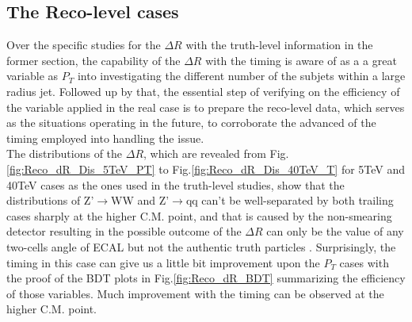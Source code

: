 

\subsection{The Reco-level cases}
Over the specific studies for the $\Delta R$ with the truth-level information in the former section, the capability of the $\Delta R$ with the timing is aware of as a a great variable as $P_{T}$ into investigating the different number of the subjets within a large radius jet. Followed up by that, the essential step of verifying on the efficiency of the variable applied in the real case is to prepare the reco-level data, which serves as the situations operating in the future, to corroborate the advanced of the timing employed into handling the issue.\\ 

The distributions of the $\Delta R$, which are revealed from Fig.\ref{fig:Reco_dR_Dis_5TeV_PT} to Fig.\ref{fig:Reco_dR_Dis_40TeV_T} for 5TeV and 40TeV cases as the ones used in the truth-level studies, show that the distributions of Z'$\rightarrow$WW and Z'$\rightarrow$qq can't be well-separated by both trailing cases sharply at the higher C.M. point, and that is caused by the non-smearing detector resulting in the possible outcome of the $\Delta R$ can only be the value of any two-cells angle of ECAL but not the authentic truth particles . Surprisingly, the timing in this case can give us a little bit improvement upon the $P_{T}$ cases with the proof of the BDT plots in Fig.\ref{fig:Reco_dR_BDT} summarizing the efficiency of those variables. Much improvement with the timing can be observed at the higher C.M. point.\\


